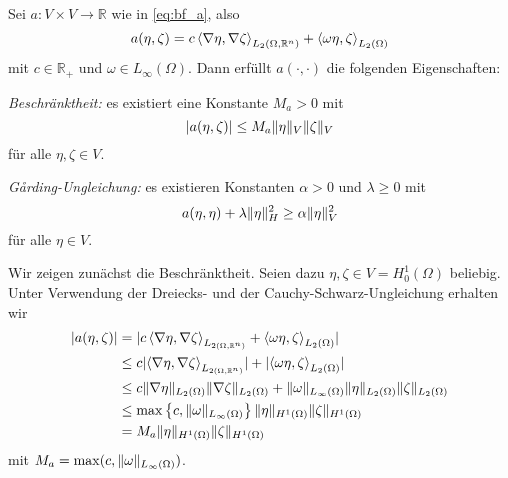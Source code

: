 \begin{Lemma}
    \label{lemma:a_bf_bounded_garding}
    Sei $a \colon V \times V \to \mathbb{R}$ wie in \eqref{eq:bf_a}, also
    \begin{equation}
        a(\eta, \zeta) = c \left\langle\nabla \eta,\nabla \zeta\right\rangle_{L_{2}(\Omega, \mathbb{R}^{n})} + \left\langle\omega \eta,\zeta\right\rangle_{L_{2}(\Omega)}
    \end{equation}
    mit $c \in \mathbb{R}_{+}$ und $\omega \in L_{\infty}(\Omega)$.
    Dann erfüllt $a(\cdot, \cdot)$ die folgenden Eigenschaften:
    \begin{thmenumerate}
        \item \emph{Beschränktheit:} es existiert eine Konstante $M_{a} > 0$ mit
        \begin{equation}
            \lvert a(\eta, \zeta)\rvert \leq M_{a} \lVert\eta\rVert_{V} \lVert\zeta\rVert_{V}
        \end{equation}
        für alle $\eta, \zeta \in V$.
        \label{lemma:a_bf_bounded_garding:1}
        \item \emph{G\aa{}rding-Ungleichung:} es existieren Konstanten $\alpha > 0$ und $\lambda \geq 0$ mit
        \begin{equation}
                a(\eta, \eta) + \lambda \lVert\eta\rVert_{H}^{2} \geq \alpha \lVert\eta\rVert_{V}^{2}
        \end{equation}
        für alle $\eta \in V$.
        \label{lemma:a_bf_bounded_garding:2}
    \end{thmenumerate}

    \begin{Beweis}
    Wir zeigen zunächst die Beschränktheit.
    Seien dazu $\eta, \zeta \in V = H^{1}_{0}(\Omega)$ beliebig.
    Unter Verwendung der Dreiecks- und der Cauchy-Schwarz-Ungleichung erhalten wir
    \begin{align}
        \lvert a(\eta, \zeta)\rvert
        &= \lvert c \left\langle\nabla \eta,\nabla \zeta\right\rangle_{L_{2(\Omega, \mathbb{R}^{n})}} + \left\langle\omega \eta,\zeta\right\rangle_{L_{2}(\Omega)}\rvert
        \\&\leq c \lvert\left\langle\nabla \eta,\nabla \zeta\right\rangle_{L_{2(\Omega, \mathbb{R}^{n})}}\rvert + \lvert\left\langle\omega \eta,\zeta\right\rangle_{L_{2}(\Omega)}\rvert
        \\&\leq c \lVert\nabla \eta\rVert_{L_{2}(\Omega)} \lVert\nabla \zeta\rVert_{L_{2}(\Omega)} + \lVert\omega\rVert_{L_{\infty}(\Omega)} \lVert\eta\rVert_{L_{2}(\Omega)} \lVert\zeta\rVert_{L_{2}(\Omega)}
        \\&\leq \max \left\{ c, \lVert\omega\rVert_{L_{\infty}(\Omega)} \right\} \lVert\eta\rVert_{H^{1}(\Omega)} \lVert\zeta\rVert_{H^{1}(\Omega)}
        \\&= M_{a} \lVert\eta\rVert_{H^{1}(\Omega)} \lVert\zeta\rVert_{H^{1}(\Omega)}
    \end{align}
    mit $M_{a} = \max(c, \lVert\omega\rVert_{L_{\infty}(\Omega)} )$.


\end{Beweis}
\end{Lemma}
